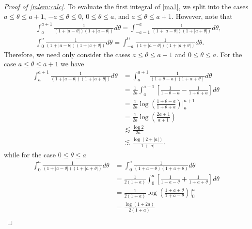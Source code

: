 \begin{proof}[Proof of \cref{mlem:calc}]
To evaluate the first integral of \eqref{ma1}, we split into the cases $a \le \theta \le
a+1$, $-a \le \theta \le 0$, $0 \le \theta \le a$, and $a \le \theta \le a+1$.
However, note that 
%
%
\begin{equation*}
	\begin{split}
		& \int_{a}^{a+1} \frac{1}{(1 + | a - \theta |)(1 + | a + \theta |)}d \theta =
		\int_{-a-1}^{-a} \frac{1}{(1 + | a - \theta |)(1 + | a + \theta |)}d \theta,
		\\
		& \int_{0}^{a} \frac{1}{(1 + | a - \theta |)(1 + | a + \theta |)}d \theta =
		\int_{-a}^{0} \frac{1}{(1 + | a - \theta |)(1 + | a + \theta |)}d \theta.
	\end{split}
\end{equation*}
%
%
Therefore, we need only consider the cases $a \le \theta \le a+1$ and $0 \le
\theta \le a$.  For the case $a \le \theta \le a+1$ we have
%
%
\begin{equation*}
	\begin{split}
		\int_{a}^{a+1} \frac{1}{(1 + | a-\theta |)(1 + | a + \theta |)}d \theta
		& = \int_{a}^{a+1} \frac{1}{(1 + \theta -a)(1 + a + \theta)}d \theta
		\\
		& = \frac{1}{2a} \int_{a}^{a+1} \left[ \frac{1}{1 + \theta -a} -
		\frac{1}{1 + \theta + a}  \right]d \theta
		\\
		& =\frac{1}{2a} \log\left( \frac{1 + \theta -a}{1 + \theta + a} \right) \Big
		|_a^{a+1}
		\\
		& = \frac{1}{2a} \log\left( \frac{2a+1}{a+1} \right)
		\\
		& \lesssim\frac{\log 2}{2a}
		\\
		& \lesssim \frac{\log(2 + | a |)}{1 + | a |}.
	\end{split}
\end{equation*}
%
%
while for the case $0 \le \theta \le a$
%
%
\begin{equation*}
	\begin{split}
		\int_{0}^{a} \frac{1}{(1 + | a - \theta |)(1 + | a + \theta |)}d \theta
		& = \int_{0}^{a} \frac{1}{(1 +  a - \theta )(1 +  a + \theta )}d \theta
		\\
		& = \frac{1}{2(1 + a)} \int_{0}^{a} \left[ \frac{1}{1 + a - \theta} +
		\frac{1}{1 + a + \theta} \right]d \theta
		\\
		& = \frac{1}{2(1 + a)} \log \left( \frac{1 + a + \theta}{1 + a - \theta}
		\right) \Big |_{0}^{a}
		\\
		& = \frac{\log\left( 1 + 2a \right)}{2\left( 1 + a \right)}
		\\

\end{split}
\end{equation*}
\end{proof}
